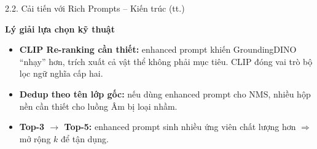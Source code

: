 \documentclass[11pt]{beamer}
\begin{document}
\begin{frame}{2.2. Cải tiến với Rich Prompts -- Kiến trúc (tt.)}
\begin{block}{\textbf{Lý giải lựa chọn kỹ thuật}}
\begin{itemize}
  \item \textbf{CLIP Re-ranking cần thiết:} enhanced prompt khiến GroundingDINO ``nhạy'' hơn, trích xuất cả vật thể không phải mục tiêu. CLIP đóng vai trò bộ lọc ngữ nghĩa cấp hai.
  \item \textbf{Dedup theo tên lớp gốc:} nếu dùng enhanced prompt cho NMS, nhiều hộp nền cần thiết cho luồng Âm bị loại nhầm.
  \item \textbf{Top-3 $\to$ Top-5:} enhanced prompt sinh nhiều ứng viên chất lượng hơn $\Rightarrow$ mở rộng $k$ để tận dụng.
\end{itemize}
\end{block}

\end{frame}
\end{document}
